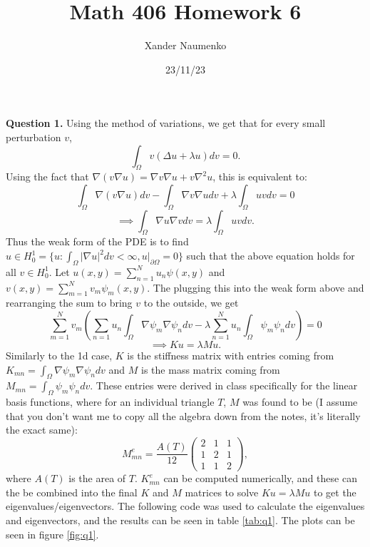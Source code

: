 \documentclass[letterpaper, reqno,11pt]{article}
\begin{document}
\title{Math 406 Homework 6}
\date{23/11/23}
\author{Xander Naumenko}
\maketitle

{\medskip\noindent\bf Question 1.} Using the method of variations, we get that for every small perturbation $v$,
\[
\int_{\Omega}v\left( \Delta u+\lambda u \right) dv=0
.\]
Using the fact that $\nabla (v\nabla  u)=\nabla v \nabla u+v\nabla ^2u$, this is equivalent to:
\[
\int_{\Omega}\nabla (v\nabla u)dv-\int_{\Omega}\nabla v \nabla u dv+\lambda \int_{\Omega}uvdv=0
\]
\[
\implies \int_{\Omega}\nabla u\nabla v dv=\lambda \int_{\Omega}uv dv
.\]
Thus the weak form of the PDE is to find $u\in H_{0}^{1}=\{u: \int_{\Omega}\left| \nabla  u \right| ^2dv<\infty,u\big|_{\partial \Omega}=0\}$ such that the above equation holds for all $v\in H_{0}^{1}$. Let $u(x,y)=\sum_{n=1}^{N}u_n\psi(x,y)$ and $v(x,y)=\sum_{m=1}^{N}v_m\psi_m(x,y)$. The plugging this into the weak form above and rearranging the sum to bring $v$ to the outside, we get
\[
\sum_{m=1}^{N}v_m \left( \sum_{n=1}u_n\int_{\Omega} \nabla \psi_m\nabla \psi_ndv-\lambda\sum_{n=1}^{N}u_n\int_{\Omega}\psi_m\psi_n dv \right)=0
\]
\[
\implies Ku=\lambda Mu
.\]
Similarly to the 1d case, $K$ is the stiffness matrix with entries coming from $K_{mn}=\int_{\Omega}\nabla \psi_m\nabla \psi_n dv$ and $M$ is the mass matrix coming from $M_{mn}=\int_{\Omega}\psi_m\psi_ndv$. These entries were derived in class specifically for the linear basis functions, where for an individual triangle $T$, $M$ was found to be (I assume that you don't want me to copy all the algebra down from the notes, it's literally the exact same):
\[
    M_{mn}^{e}=\frac{A(T)}{12}\begin{pmatrix} 2&1&1\\1&2&1\\1&1&2 \end{pmatrix}%
,\]
where $A(T)$ is the area of $T$. $K_{mn}^{e}$ can be computed numerically, and these can the be combined into the final $K$ and $M$ matrices to solve $Ku=\lambda Mu$ to get the eigenvalues/eigenvectors. The following code was used to calculate the eigenvalues and eigenvectors, and the results can be seen in table \ref{tab:q1}. The plots can be seen in figure \ref{fig:q1}.
\end{document}
